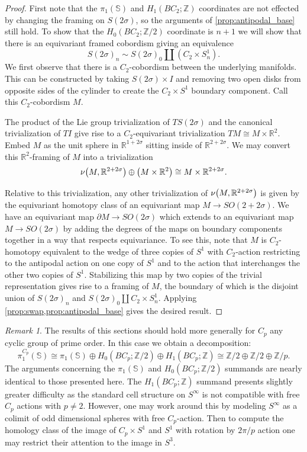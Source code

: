 \documentclass[11pt]{amsart}
\newcommand{\R}{\mathbb R}
\newcommand{\Z}{\mathbb{Z}}
\newcommand{\Sph}{\mathbb{S}}
\theoremstyle{plain}   %
\theoremstyle{definition}
\theoremstyle{remark}
\newtheorem{rmk}[thm]{Remark}
\numberwithin{equation}{section}
\let\originalleft\left
\let\originalright\right
\renewcommand{\left}{\mathopen{}\mathclose\bgroup\originalleft}
\renewcommand{\right}{\aftergroup\egroup\originalright}
\begin{document}
\begin{proof}
First note that the $\pi_1(\Sph)$ and $H_1(BC_2;\Z)$ coordinates are not effected by changing the framing on $S(2\sigma)$, so the arguments of \cref{prop:antipodal_base} still hold. To show that the $H_0(BC_2;\Z/2)$ coordinate is $n+1$ we will show that there is an equivariant framed cobordism giving an equivalence
\[
S(2\sigma)_n \sim S(2\sigma)_0\amalg (C_2\times S^1_n).
\]
We first observe that there is a $C_2$-cobordism between the underlying manifolds. This can be constructed by taking $S(2\sigma)\times I$ and removing two open disks from opposite sides of the cylinder to create the $C_2\times S^1$ boundary component. Call this $C_2$-cobordism $M$. 

The product of the Lie group trivialization of $TS(2\sigma)$ and the canonical trivialization of $TI$ give rise to a $C_2$-equivariant trivialization $TM\cong M\times\R^2$. Embed $M$ as the unit sphere in $\R^{1+2\sigma}$ sitting inside of $\R^{2+2\sigma}$. We may convert this $\R^2$-framing of $M$ into a trivialization 
\[
\nu\left(M,\R^{2+2\sigma}\right)\oplus \left(M\times \R^2\right) \cong M\times\R^{2+2\sigma}.
\]

Relative to this trivialization, any other trivialization of $\nu\left(M,\R^{2+2\sigma}\right)$ is given by the equivariant homotopy class of an equivariant map $M\to SO(2+2\sigma)$. We have an equivariant map $\partial M\to SO(2\sigma)$ which extends to an equivariant map $M\to SO(2\sigma)$ by adding the degrees of the maps on boundary components together in a way that respects equivariance. To see this, note that $M$ is  $C_2$-homotopy equivalent to the wedge of three copies of $S^1$ with $C_2$-action restricting to the antipodal action on one copy of $S^1$ and to the action that interchanges the other two copies of $S^1$. Stabilizing this map by two copies of the trivial representation gives rise to a framing of $M$, the boundary of which is the disjoint union of $S(2\sigma)_n$ and $S(2\sigma)_0\amalg C_2\times S^1_n$. Applying \cref{prop:swap,prop:antipodal_base} gives the desired result.  
\end{proof}

\begin{rmk}
The results of this sections should hold more generally for $C_p$ any cyclic group of prime order. In this case we obtain a decomposition:
\[
\pi_1^{C_p}(\Sph)\cong \pi_1(\Sph)\oplus H_0(BC_p;\Z/2)\oplus H_1(BC_p;\Z) \cong \Z/2\oplus \Z/2\oplus \Z/p.
\]
The arguments concerning the $\pi_1(\Sph)$ and $H_0(BC_p;\Z/2)$ summands are nearly identical to those presented here. The $H_1(BC_p;\Z)$ summand presents slightly greater difficulty as the standard cell structure on $S^\infty$ is not compatible with free $C_p$ actions with $p\neq 2$. However, one may work around this by modeling $S^\infty$ as a colimit of odd dimensional spheres with free $C_p$-action. Then to compute the homology class of the image of $C_p\times S^1$ and $S^1$ with rotation by $2\pi/p$ action one may restrict their attention to the image in $S^3$. 
\end{rmk}
\end{document}
